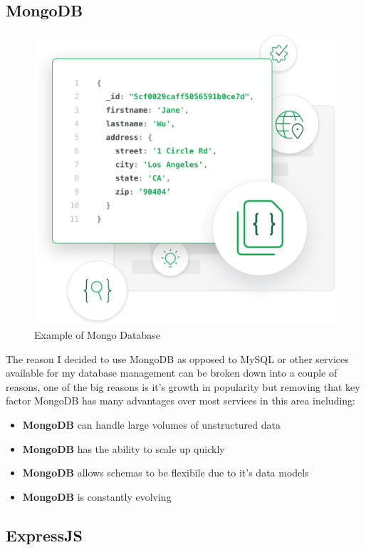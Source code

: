 \subsection{MongoDB}

\begin{figure}[H]
  \includegraphics[scale=0.35]{img/mongodbeg.png}
  \centering
  \caption{Example of Mongo Database}
  \label{fig: Mongo Database}
\end{figure}

The reason I decided to use MongoDB as opposed to MySQL or other services available for my database management can be broken down into a couple of reasons, one of the big reasons is it's growth in popularity but removing that key factor MongoDB has many advantages over most services in this area including:

\begin{itemize}
\item\textbf{MongoDB} can handle large volumes of unstructured data
\item\textbf{MongoDB} has the ability to scale up quickly
\item\textbf{MongoDB} allows schemas to be flexibile due to it's data models
\item\textbf{MongoDB} is constantly evolving
\end{itemize}

\subsection{ExpressJS}

